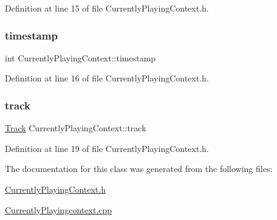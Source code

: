 Definition at line 15 of file Currently\+Playing\+Context.\+h.

\mbox{\label{class_currently_playing_context_a391a3e551b489457c722fcee606412e8}} 
\subsubsection{\texorpdfstring{timestamp}{timestamp}}
{\footnotesize\ttfamily int Currently\+Playing\+Context\+::timestamp\hspace{0.3cm}{\ttfamily [private]}}



Definition at line 16 of file Currently\+Playing\+Context.\+h.

\mbox{\label{class_currently_playing_context_a840cce2522aec1b8cf2ecd0f675d516c}} 
\subsubsection{\texorpdfstring{track}{track}}
{\footnotesize\ttfamily \mbox{\hyperlink{class_track}{Track}} Currently\+Playing\+Context\+::track\hspace{0.3cm}{\ttfamily [private]}}



Definition at line 19 of file Currently\+Playing\+Context.\+h.



The documentation for this class was generated from the following files\+:\begin{DoxyCompactItemize}
\item 
\mbox{\hyperlink{_currently_playing_context_8h}{Currently\+Playing\+Context.\+h}}\item 
\mbox{\hyperlink{_currently_playingcontext_8cpp}{Currently\+Playingcontext.\+cpp}}\end{DoxyCompactItemize}

